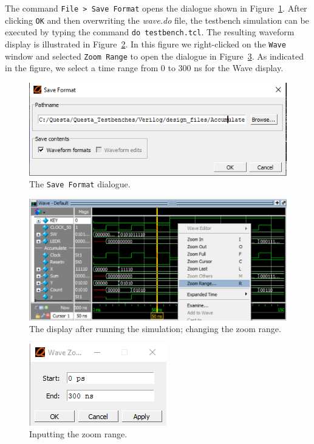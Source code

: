 \documentclass[11pt, twoside, pdftex]{article}
\begin{document}
\noindent
The command \texttt{File > Save Format} opens the dialogue shown in Figure~\ref{fig:appa_fig9}.
After clicking \texttt{OK} and then overwriting the {\it wave.do} file, the testbench 
simulation can be executed by typing the command \texttt{do testbench.tcl}. The resulting
waveform display is illustrated in Figure~\ref{fig:appa_fig10}. In this figure we
right-clicked on the \texttt{Wave} window and selected \texttt{Zoom Range} to open the
dialogue in Figure~\ref{fig:appa_fig11}. As indicated in the figure, we select a time range 
from 0 to 300 ns for the Wave display.

\begin{figure}[h!]
	\begin{center}
		\includegraphics[scale=0.8]{figures/appa_fig9.png}
	\end{center}
	\caption{The \texttt{Save Format} dialogue.}
	\label{fig:appa_fig9}
\end{figure}

\begin{figure}[h!]
	\begin{center}
		\includegraphics[scale=0.8]{figures/appa_fig10.png}
	\end{center}
		  \caption{The display after running the simulation; changing the zoom range.}
	\label{fig:appa_fig10}
\end{figure}

\begin{figure}[h!]
	\begin{center}
		\includegraphics[scale=0.8]{figures/appa_fig11.png}
	\end{center}
		  \caption{Inputting the zoom range.}
	\label{fig:appa_fig11}
\end{figure}
\end{document}
